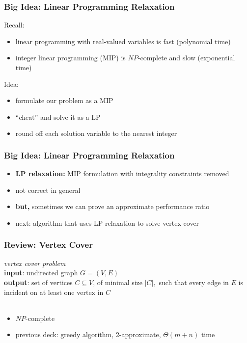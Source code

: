 \documentclass{beamer}
\newcommand{\stanza}{ \\~\ }
\begin{document}
\begin{frame} \frametitle{Big Idea: Linear Programming Relaxation}
Recall:
\begin{itemize}
  \item linear programming with real-valued variables is fast (polynomial time)
  \item integer linear programming (MIP) is $NP$-complete and slow (exponential time)
\end{itemize}

Idea:
\begin{itemize}
  \item formulate our problem as a MIP
  \item ``cheat'' and solve it as a LP
  \item round off each solution variable to the nearest integer
\end{itemize}
\end{frame}

\begin{frame} \frametitle{Big Idea: Linear Programming Relaxation}
\begin{itemize}
  \item \textbf{LP relaxation:} MIP formulation with integrality constraints removed
  \item not correct in general
  \item \textbf{but,} sometimes we can prove an approximate performance ratio
  \item next: algorithm that uses LP relaxation to solve vertex cover
\end{itemize}
\end{frame}

\begin{frame} \frametitle{Review: Vertex Cover}
  \emph{vertex cover problem} \\
  \textbf{input}: undirected graph $G=(V,E)$ \\
  \textbf{output}: set of vertices $C \subseteq V$, of minimal size $|C|,$ such
    that every edge in $E$ is incident on at least one vertex in $C$
   \stanza
  \begin{itemize}
    \item $NP$-complete
    \item previous deck: greedy algorithm, 2-approximate, $\Theta(m+n)$ time
  \end{itemize}
\end{frame}
\end{document}
